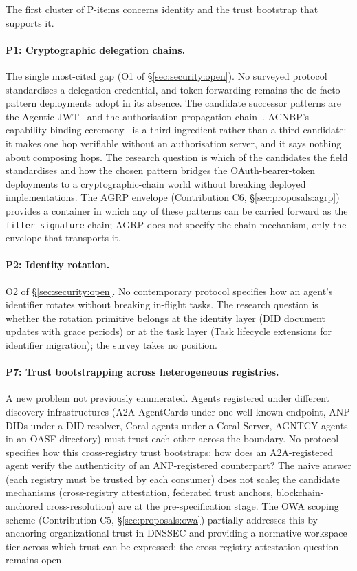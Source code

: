 The first cluster of P-items concerns identity and the
trust bootstrap that supports it.

\paragraph{P1: Cryptographic delegation chains.}
The single most-cited gap (O1 of
\S\ref{sec:security:open}). No surveyed protocol
standardises a delegation credential, and token forwarding
remains the de-facto pattern deployments adopt in its
absence. The candidate successor patterns are the Agentic
JWT~\cite{agentic_jwt} and the
authorisation-propagation chain~\cite{authz_propagation}.
ACNBP's capability-binding
ceremony~\cite{spec_acnbp} is a third ingredient rather
than a third candidate: it makes one hop verifiable
without an authorisation server, and it says nothing about
composing hops. The research question is which
of the candidates the field standardises and how the
chosen pattern bridges the OAuth-bearer-token
deployments to a cryptographic-chain world without
breaking deployed implementations. The AGRP envelope
(Contribution C6, \S\ref{sec:proposals:agrp}) provides a
container in which any of these patterns can be carried
forward as the \texttt{filter\_signature} chain; AGRP does
not specify the chain mechanism, only the envelope that
transports it.

\paragraph{P2: Identity rotation.}
O2 of \S\ref{sec:security:open}. No contemporary
protocol specifies how an agent's identifier rotates
without breaking in-flight tasks. The research question
is whether the rotation primitive belongs at the
identity layer (DID document updates with grace
periods) or at the task layer (Task lifecycle
extensions for identifier migration); the survey
takes no position.

\paragraph{P7: Trust bootstrapping across heterogeneous
registries.}
A new problem not previously enumerated. Agents
registered under different discovery infrastructures
(A2A AgentCards under one well-known endpoint, ANP
DIDs under a DID resolver, Coral agents under a
Coral Server, AGNTCY agents in an OASF directory) must
trust each other across the boundary. No protocol
specifies how this cross-registry trust bootstraps:
how does an A2A-registered agent verify the
authenticity of an ANP-registered counterpart?
The naive answer (each registry must be trusted by
each consumer) does not scale; the candidate
mechanisms (cross-registry attestation, federated
trust anchors, blockchain-anchored cross-resolution)
are at the pre-specification stage. The OWA scoping
scheme (Contribution C5, \S\ref{sec:proposals:owa})
partially addresses this by anchoring organizational
trust in DNSSEC and providing a normative workspace
tier across which trust can be expressed; the
cross-registry attestation question remains open.

